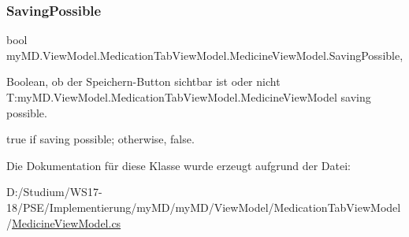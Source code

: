 \subsubsection{\texorpdfstring{Saving\+Possible}{SavingPossible}}
{\footnotesize\ttfamily bool my\+M\+D.\+View\+Model.\+Medication\+Tab\+View\+Model.\+Medicine\+View\+Model.\+Saving\+Possible\hspace{0.3cm}{\ttfamily [get]}, {\ttfamily [set]}}



Boolean, ob der Speichern-\/\+Button sichtbar ist oder nicht T\+:my\+M\+D.\+View\+Model.\+Medication\+Tab\+View\+Model.\+Medicine\+View\+Model saving possible. 

{\ttfamily true} if saving possible; otherwise, {\ttfamily false}.

Die Dokumentation für diese Klasse wurde erzeugt aufgrund der Datei\+:\begin{DoxyCompactItemize}
\item 
D\+:/\+Studium/\+W\+S17-\/18/\+P\+S\+E/\+Implementierung/my\+M\+D/my\+M\+D/\+View\+Model/\+Medication\+Tab\+View\+Model/\mbox{\hyperlink{_medicine_view_model_8cs}{Medicine\+View\+Model.\+cs}}\end{DoxyCompactItemize}
